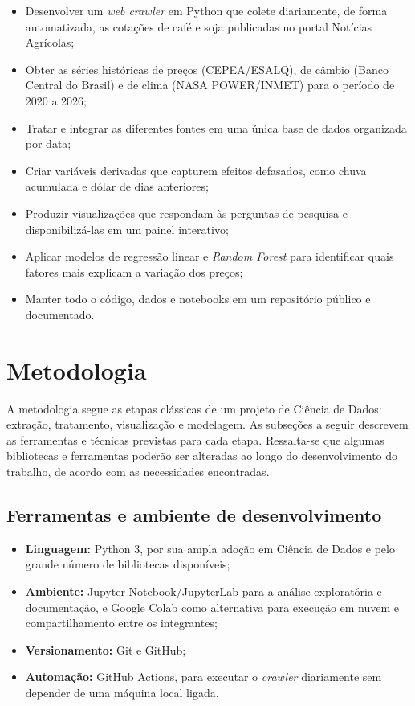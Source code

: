 \documentclass{article}
\begin{document}
\begin{itemize}
      \item Desenvolver um \textit{web crawler} em Python que colete diariamente, de forma automatizada, as
            cotações de café e soja publicadas no portal Notícias Agrícolas;
      \item Obter as séries históricas de preços (CEPEA/ESALQ), de câmbio (Banco Central do Brasil) e de
            clima (NASA POWER/INMET) para o período de 2020 a 2026;
      \item Tratar e integrar as diferentes fontes em uma única base de dados organizada por data;
      \item Criar variáveis derivadas que capturem efeitos defasados, como chuva acumulada e dólar de dias
            anteriores;
      \item Produzir visualizações que respondam às perguntas de pesquisa e disponibilizá-las em um painel
            interativo;
      \item Aplicar modelos de regressão linear e \textit{Random Forest} para identificar quais fatores mais
            explicam a variação dos preços;
      \item Manter todo o código, dados e notebooks em um repositório público e documentado.
\end{itemize}


\section{Metodologia}

A metodologia segue as etapas clássicas de um projeto de Ciência de Dados: extração, tratamento,
visualização e modelagem. As subseções a seguir descrevem as ferramentas e técnicas previstas para cada
etapa. Ressalta-se que algumas bibliotecas e ferramentas poderão ser alteradas ao longo do desenvolvimento
do trabalho, de acordo com as necessidades encontradas.

\subsection{Ferramentas e ambiente de desenvolvimento}

\begin{itemize}
      \item \textbf{Linguagem:} Python 3, por sua ampla adoção em Ciência de Dados e pelo grande número de
            bibliotecas disponíveis;
      \item \textbf{Ambiente:} Jupyter Notebook/JupyterLab para a análise exploratória e documentação, e
            Google Colab como alternativa para execução em nuvem e compartilhamento entre os integrantes;
      \item \textbf{Versionamento:} Git e GitHub;
      \item \textbf{Automação:} GitHub Actions, para executar o \textit{crawler} diariamente sem depender de
            uma máquina local ligada.
\end{itemize}
\end{document}
